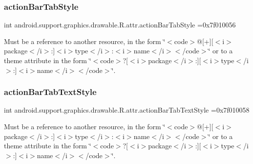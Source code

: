 \subsubsection{\texorpdfstring{action\+Bar\+Tab\+Style}{actionBarTabStyle}}
{\footnotesize\ttfamily int android.\+support.\+graphics.\+drawable.\+R.\+attr.\+action\+Bar\+Tab\+Style =0x7f010056\hspace{0.3cm}{\ttfamily [static]}}

Must be a reference to another resource, in the form \char`\"{}$<$code$>$@\mbox{[}+\mbox{]}\mbox{[}$<$i$>$package$<$/i$>$\+:\mbox{]}$<$i$>$type$<$/i$>$\+:$<$i$>$name$<$/i$>$$<$/code$>$\char`\"{} or to a theme attribute in the form \char`\"{}$<$code$>$?\mbox{[}$<$i$>$package$<$/i$>$\+:\mbox{]}\mbox{[}$<$i$>$type$<$/i$>$\+:\mbox{]}$<$i$>$name$<$/i$>$$<$/code$>$\char`\"{}. \mbox{\label{classandroid_1_1support_1_1graphics_1_1drawable_1_1R_1_1attr_a75fe52c7dc6760d3478dc353b95e0742}} 
\subsubsection{\texorpdfstring{action\+Bar\+Tab\+Text\+Style}{actionBarTabTextStyle}}
{\footnotesize\ttfamily int android.\+support.\+graphics.\+drawable.\+R.\+attr.\+action\+Bar\+Tab\+Text\+Style =0x7f010058\hspace{0.3cm}{\ttfamily [static]}}

Must be a reference to another resource, in the form \char`\"{}$<$code$>$@\mbox{[}+\mbox{]}\mbox{[}$<$i$>$package$<$/i$>$\+:\mbox{]}$<$i$>$type$<$/i$>$\+:$<$i$>$name$<$/i$>$$<$/code$>$\char`\"{} or to a theme attribute in the form \char`\"{}$<$code$>$?\mbox{[}$<$i$>$package$<$/i$>$\+:\mbox{]}\mbox{[}$<$i$>$type$<$/i$>$\+:\mbox{]}$<$i$>$name$<$/i$>$$<$/code$>$\char`\"{}. \mbox{\label{classandroid_1_1support_1_1graphics_1_1drawable_1_1R_1_1attr_a477c6c4bed2e28f16e9196d74fecf16a}} 
